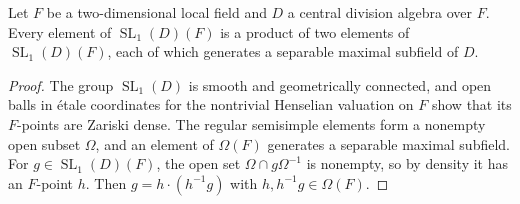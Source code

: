 \begin{lemma}\label{lem:second-sl1-two-generators}
Let $F$ be a two-dimensional local field and $D$ a central division algebra over $F$.
Every element of $\operatorname{SL}_1(D)(F)$ is a product of two elements of $\operatorname{SL}_1(D)(F)$, each of which generates a separable maximal subfield of $D$.
\end{lemma}
\begin{proof}
The group $\operatorname{SL}_1(D)$ is smooth and geometrically connected, and open balls in \'etale coordinates for the nontrivial Henselian valuation on $F$ show that its $F$-points are Zariski dense.
The regular semisimple elements form a nonempty open subset $\Omega$, and an element of $\Omega(F)$ generates a separable maximal subfield.
For $g\in\operatorname{SL}_1(D)(F)$, the open set $\Omega\cap g\Omega^{-1}$ is nonempty, so by density it has an $F$-point $h$.
Then $g=h\cdot(h^{-1}g)$ with $h,h^{-1}g\in\Omega(F)$.
\end{proof}


